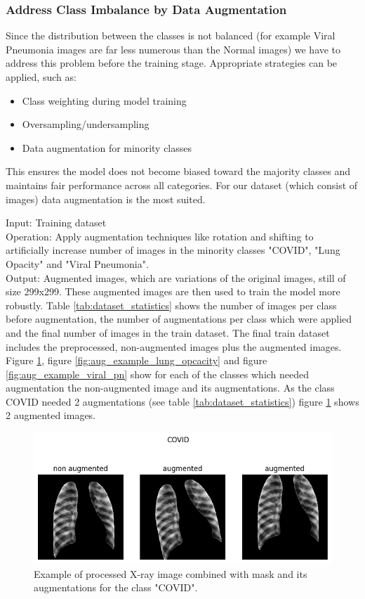 \documentclass{article}
\begin{document}
\subsubsection{Address Class Imbalance by Data Augmentation} \label{augment}
Since the distribution between the classes is not balanced (for example Viral Pneumonia images are far less numerous than the Normal images) we have to address this problem 
before the training stage. Appropriate strategies can be applied, such as:
\begin{itemize}
    \item Class weighting during model training
    \item Oversampling/undersampling
    \item Data augmentation for minority classes
\end{itemize}
This ensures the model does not become biased toward the majority classes and maintains fair performance across all categories. For our dataset (which consist of images) data augmentation is the most suited.

Input: Training dataset \\%
Operation: Apply augmentation techniques like rotation and shifting to artificially increase number of images in the minority classes "COVID", "Lung Opacity" and 
"Viral Pneumonia".\\
Output: Augmented images, which are variations of the original images, still of size 299x299. These augmented images are then used to train the model more robustly. 
Table \ref{tab:dataset_statistics} shows the number of images per class before augmentation, the number of augmentations per class which were applied and the
final number of images in the train dataset. The final train dataset includes the preprocessed, non-augmented images plus the augmented images.\\
Figure \ref{fig:aug_example_covid}, figure \ref{fig:aug_example_lung_opcacity} and figure \ref{fig:aug_example_viral_pn} show for each of the classes which needed 
augmentation the non-augmented image and its augmentations. As the class COVID needed 2 augmentations (see table \ref{tab:dataset_statistics}) figure \ref{fig:aug_example_covid} 
shows 2 augmented images. 


\begin{figure}[!htb] %
    \centering
    \includegraphics[width=0.85\linewidth]{aug_example_covid.png}
    \caption{Example of processed X-ray image combined with mask and its augmentations for the class "COVID".}
    \label{fig:aug_example_covid}
\end{figure}
\end{document}
